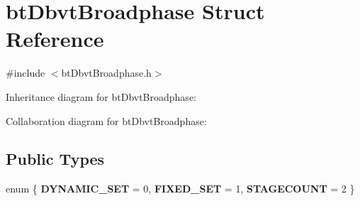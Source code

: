 \hypertarget{structbt_dbvt_broadphase}{\section{bt\+Dbvt\+Broadphase Struct Reference}
\label{structbt_dbvt_broadphase}
}


{\ttfamily \#include $<$bt\+Dbvt\+Broadphase.\+h$>$}



Inheritance diagram for bt\+Dbvt\+Broadphase\+:


Collaboration diagram for bt\+Dbvt\+Broadphase\+:
\subsection*{Public Types}
\begin{DoxyCompactItemize}
\item 
\hypertarget{structbt_dbvt_broadphase_a9c04b0b115994ea152ec738daaaf800d}{enum \{ {\bfseries D\+Y\+N\+A\+M\+I\+C\+\_\+\+S\+E\+T} = 0, 
{\bfseries F\+I\+X\+E\+D\+\_\+\+S\+E\+T} = 1, 
{\bfseries S\+T\+A\+G\+E\+C\+O\+U\+N\+T} = 2
 \}}\label{structbt_dbvt_broadphase_a9c04b0b115994ea152ec738daaaf800d}

\end{DoxyCompactItemize}
